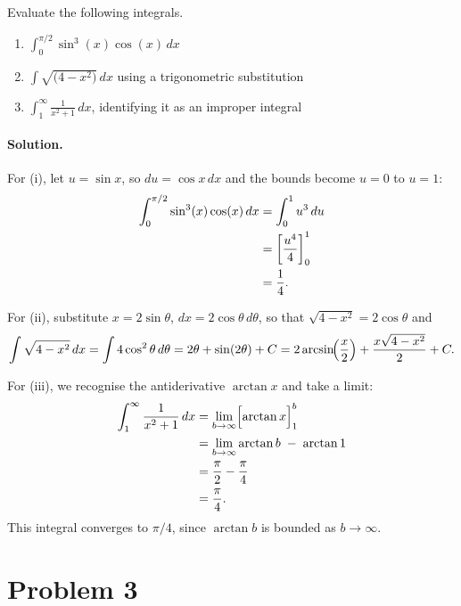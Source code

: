 \documentclass[11pt]{article}
\begin{document}
Evaluate the following integrals.

\begin{enumerate}[label=(\roman*)]
  \item $\displaystyle\int_0^{\pi/2} \sin^3(x)\cos(x)\,dx$
  \item $\displaystyle\int \sqrt{\bigl(4 - x^2\bigr)}\,dx$ using a trigonometric substitution
  \item $\displaystyle\int_1^{\infty} \frac{1}{x^2 + 1}\,dx$, identifying it as an improper integral
\end{enumerate}

\paragraph{Solution.} For (i), let $u = \sin x$, so $du = \cos x\,dx$ and the bounds become
$u=0$ to $u=1$:
\begin{align}
  \int_0^{\pi/2} \sin^3(x)\cos(x)\,dx
    &= \int_0^1 u^3\,du \notag \\
    &= \left[\frac{u^4}{4}\right]_0^1 \notag \\
    &= \frac{1}{4}.
\end{align}

For (ii), substitute $x = 2\sin\theta$, $dx = 2\cos\theta\,d\theta$, so that
$\sqrt{4-x^2} = 2\cos\theta$ and
\[
  \int \sqrt{4-x^2}\,dx = \int 4\cos^2\theta\,d\theta
  = 2\theta + \sin(2\theta) + C
  = 2\arcsin\!\Bigl(\frac{x}{2}\Bigr) + \frac{x\sqrt{4-x^2}}{2} + C.
\]

For (iii), we recognise the antiderivative $\arctan x$ and take a limit:
\begin{align*}
  \int_1^{\infty} \frac{1}{x^2+1}\,dx
  &= \lim_{b \to \infty} \Bigl[\arctan x\Bigr]_1^{b} \\
  &= \lim_{b \to \infty} \arctan b \;-\; \arctan 1 \\
  &= \frac{\pi}{2} - \frac{\pi}{4} \\
  &= \frac{\pi}{4}.
\end{align*}
This integral converges to $\pi/4$, since $\arctan b$ is bounded as $b \to \infty$.

\section*{Problem 3}
\end{document}

